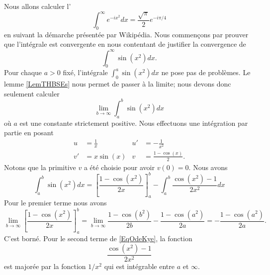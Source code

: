 Nous allons calculer l'
\begin{equation}
    \int_0^{\infty} e^{-ix^2}dx=\frac{ \sqrt{\pi} }{ 2 } e^{-i\pi/4}
\end{equation}
en suivant la démarche présentée par Wikipédia\cite{ooOXWGooGhLJvX}. Nous commençons par prouver que l'intégrale est convergente en nous contentant de justifier la convergence de
\begin{equation}
    \int_0^{\infty}\sin(x^2)dx.
\end{equation}
Pour chaque \( a>0\) fixé, l'intégrale \( \int_0^a\sin(x^2)dx\) ne pose pas de problèmes. Le lemme \ref{LemTHBSEs} nous permet de passer à la limite; nous devons donc seulement calculer
\begin{equation}
    \lim_{b\to \infty}\int_a^b\sin(x^2)dx
\end{equation}
où \( a\) est une constante strictement positive. Nous effectuons une intégration par partie en posant
\begin{subequations}
    \begin{align}
        u&=\frac{1}{ x }&   u'&=-\frac{1}{ x^2 }\\
        v'&=x\sin(x)    & v&=\frac{ 1-\cos(x) }{2}.
    \end{align}
\end{subequations}
Notons que la primitive \( v\) a été choisie pour avoir \( v(0)=0\). Nous avons
\begin{equation}    \label{EqOdeKye}
    \int_a^b\sin(x^2)dx=\left[ \frac{ 1-\cos(x^2) }{ 2x } \right]_a^b-\int_a^b\frac{ \cos(x^2)-1 }{ 2x^2 }dx
\end{equation}
Pour le premier terme nous avons
\begin{equation}
    \lim_{b\to \infty}\left[ \frac{ 1-\cos(x^2) }{ 2x } \right]_a^b=\lim_{b\to \infty}\frac{ 1-\cos(b^2) }{ 2b }-\frac{ 1-\cos(a^2) }{ 2a }=-\frac{ 1-\cos(a^2) }{ 2a }.
\end{equation}
C'est borné. Pour le second terme de \eqref{EqOdeKye}, la fonction
\begin{equation}
    \frac{ \cos(x^2)-1 }{ 2x^2 }
\end{equation}
est majorée par la fonction \( 1/x^2\) qui est intégrable entre \( a\) et \( \infty\).


